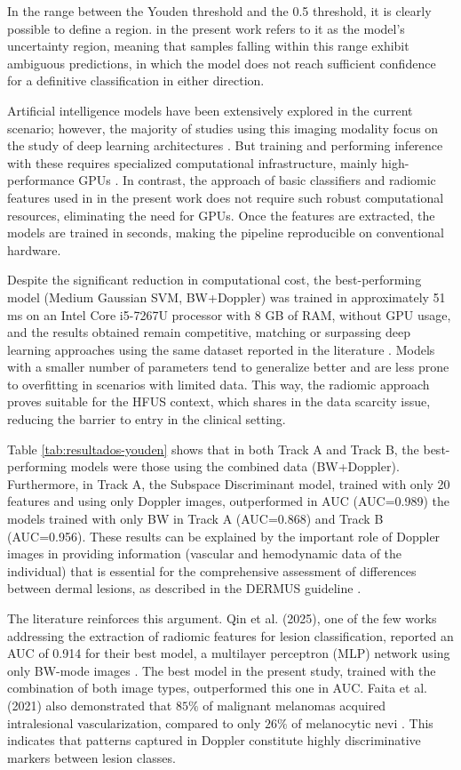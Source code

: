 \documentclass[12pt,a4paper]{article}
\begin{document}
In the range between the Youden threshold and the 0.5 threshold, it is clearly possible to define a region. in the present work refers to it as the model’s uncertainty region, meaning that samples falling within this range exhibit ambiguous predictions, in which the model does not reach sufficient confidence for a definitive classification in either direction.

Artificial intelligence models have been extensively explored in the current scenario; however, the majority of studies using this imaging modality focus on the study of deep learning architectures \cite{Qin2025}. But training and performing inference with these requires specialized computational infrastructure, mainly high-performance GPUs \cite{Czajkowska2021-2}. In contrast, the approach of basic classifiers and radiomic features used in in the present work does not require such robust computational resources, eliminating the need for GPUs. Once the features are extracted, the models are trained in seconds, making the pipeline reproducible on conventional hardware. 

Despite the significant reduction in computational cost, the best-performing model (Medium Gaussian SVM, BW+Doppler) was trained in approximately 51 ms on an Intel Core i5-7267U processor with 8 GB of RAM, without GPU usage, and the results obtained remain competitive, matching or surpassing deep learning approaches using the same dataset reported in the literature \cite{LaverdeSaad2021, daSilva2026}. Models with a smaller number of parameters tend to generalize better and are less prone to overfitting in scenarios with limited data. This way, the radiomic approach proves suitable for the HFUS context, which shares in the data scarcity issue, reducing the barrier to entry in the clinical setting.

Table \ref{tab:resultados-youden} shows that in both Track A and Track B, the best-performing models were those using the combined data (BW+Doppler). Furthermore, in Track A, the Subspace Discriminant model, trained with only 20 features and using only Doppler images, outperformed in AUC (AUC=0.989) the models trained with only BW in Track A (AUC=0.868) and Track B (AUC=0.956). These results can be explained by the important role of Doppler images in providing information (vascular and hemodynamic data of the individual) that is essential for the comprehensive assessment of differences between dermal lesions, as described in the DERMUS guideline \cite{Wortsman2016}.

The literature reinforces this argument. Qin et al. (2025), one of the few works addressing the extraction of radiomic features for lesion classification, reported an AUC of 0.914 for their best model, a multilayer perceptron (MLP) network using only BW-mode images \cite{Qin2025}. The best model in the present study, trained with the combination of both image types, outperformed this one in AUC. Faita et al. (2021) also demonstrated that $85\%$ of malignant melanomas acquired intralesional vascularization, compared to only $26\%$ of melanocytic nevi \cite{Faita2022}. This indicates that patterns captured in Doppler constitute highly discriminative markers between lesion classes.
\end{document}

